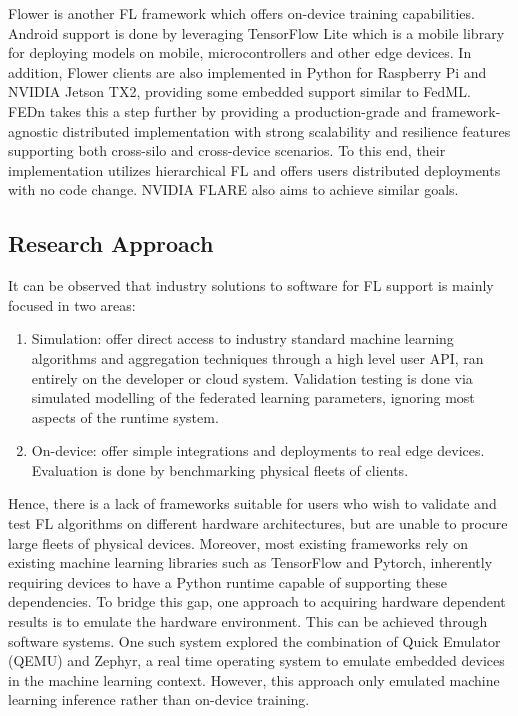 \documentclass[12pt]{article}
\begin{document}
Flower\cite{beutel2020flower} is another FL framework which offers on-device training capabilities. Android support
is done by leveraging TensorFlow Lite\cite{tflite} which is a mobile library for deploying models on mobile, microcontrollers and other edge devices.
In addition, Flower clients are also implemented in Python for Raspberry Pi and NVIDIA Jetson TX2,
providing some embedded support similar to FedML.\\

FEDn\cite{ekmefjord2021scalable} takes this a step further by providing a production-grade and framework-
agnostic distributed implementation with strong scalability and resilience features supporting both cross-silo and
cross-device scenarios. To this end, their implementation utilizes hierarchical FL\cite{} and
offers users distributed deployments with no code change. NVIDIA FLARE\cite{flare} also aims to achieve
similar goals.

\subsection{Research Approach}
It can be observed that industry solutions to software for FL support is mainly focused in two
areas:
\begin{enumerate}
  \item Simulation: offer direct access to industry standard machine learning algorithms and aggregation
    techniques through a high level user API, ran entirely on the developer or cloud system. Validation testing is done via simulated
    modelling of the federated learning parameters, ignoring most aspects of the runtime system.
  \item On-device: offer simple integrations and deployments to real edge devices. Evaluation is
    done by benchmarking physical fleets of clients.
\end{enumerate}
Hence, there is a lack of frameworks suitable for users who wish to validate and test FL algorithms on different hardware
architectures, but are unable to procure large fleets of physical devices. Moreover, most existing
frameworks rely on existing machine learning libraries such as TensorFlow and Pytorch, inherently
requiring devices to have a Python runtime capable of supporting these dependencies. To bridge this gap,
one approach to acquiring hardware dependent results is to emulate the hardware environment. This
can be achieved through software systems. One such system explored the combination of Quick Emulator (QEMU)
and Zephyr, a real time operating system to emulate embedded devices in the machine learning context\cite{ntu}. However,
this approach only emulated machine learning inference rather than on-device training.\\
\end{document}
